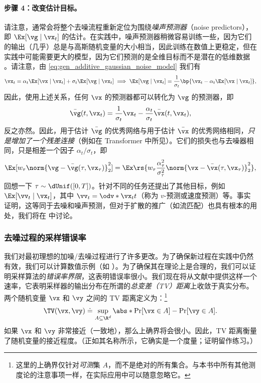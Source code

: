 \documentclass[../../book-main_zh.tex]{subfiles}
\begin{document}
\paragraph{步骤 4：改变估计目标。} 请注意，通常会将整个去噪流程重新定位为围绕\textit{噪声预测器}（noise predictors），即 \(\Ex[\vg \mid
\vx_{t}]\) 的估计。在实践中，噪声预测器稍微容易训练一些，因为它们的输出（几乎）总是与高斯随机变量的大小相当，因此训练在数值上更稳定，但在实践中可能需要更大的模型，因为它们预测的是全维目标而不是潜在的低维数据 \citep{li2025back}。请注意，由 \eqref{eq:gen_additive_gaussian_noise_model} 我们有
\begin{equation}
    \vx_{t} = \alpha_{t}\Ex[\vx \mid \vx_{t}] + \sigma_{t}\Ex[\vg
    \mid \vx_{t}] \implies \Ex[\vg \mid \vx_{t}] =
    \frac{1}{\sigma_{t}}\bp{\vx_{t} - \alpha_{t}\Ex[\vx \mid \vx_{t}]},
\end{equation}
因此，使用上述关系，任何 \(\vx\) 的预测器都可以转化为 \(\vg\) 的预测器，即
\begin{equation}
    \bar{\vg}(t, \vx_{t}) = \frac{1}{\sigma_{t}}\vx_{t} -
    \frac{\alpha_{t}}{\sigma_{t}}\bar{\vx}(t, \vx_{t}),
\end{equation}
反之亦然。因此，用于估计 \(\bar{\vg}\) 的优秀网络与用于估计 \(\bar{\vx}\) 的优秀网络相同，\textit{只是增加了一个残差连接}（例如在 Transformer 中所见）。它们的损失也与去噪器相同，只是相差一个因子 \(\alpha_{t}/\sigma_{t}\)，即
\begin{equation}
    \Ex[w_{\tau}\norm{\vg - \bar{\vg}(\tau,
    \vx_{\tau})}_{2}^{2}] =
    \Ex\rs{w_{\tau}\frac{\alpha_{\tau}^{2}}{\sigma_{\tau}^{2}}\norm{\vx
    - \bar{\vx}(\tau, \vx_{\tau})}_{2}^{2}},
\end{equation}
回想一下 \(\tau \sim \dUnif([0, T])\)。针对不同的任务还提出了其他目标，例如 \(\Ex[\vv_{t} \mid
\vx_{t}]\)，其中 \(\vv_{t} = \odv*{\vx_{t}}{t}\)（称为 \(v\)-预测或速度预测）等。事实证明，这等同于去噪和噪声预测，但对于扩散的推广（如流匹配）也具有根本的用处，我们将在  中讨论。

\subsubsection{去噪过程的采样错误率}
我们对最初理想的加噪/去噪过程进行了许多更改。为了确保新过程在实践中仍然有效，我们可以计算数值示例（如 ）。为了确保其在理论上是合理的，我们可以证明采样算法的\textit{错误率界限}，这表明错误率很小。我们现在将从文献中提供这样一个速率，它表明采样器的输出分布在所谓的\textit{总变差（TV）距离}上收敛于真实分布。两个随机变量 \(\vx\) 和 \(\vy\) 之间的 TV 距离定义为：\footnote{这里的上确界仅针对\textit{可测}集 \(A\)，而不是绝对的所有集合。与本书中所有其他测度论的注意事项一样，在实际应用中可以随意忽略它。}
\begin{equation}
    \TV(\vx, \vy) \doteq \sup_{A \subseteq \R^{d}}\abs*{\Pr[\vx \in
    A] - \Pr[\vy \in A]}.
\end{equation}
如果 \(\vx\) 和 \(\vy\) 非常接近（一致地），那么上确界将会很小。因此，TV 距离衡量了随机变量的接近程度。（正如其名称所示，它确实是一个度量；证明留作练习。）
\end{document}

